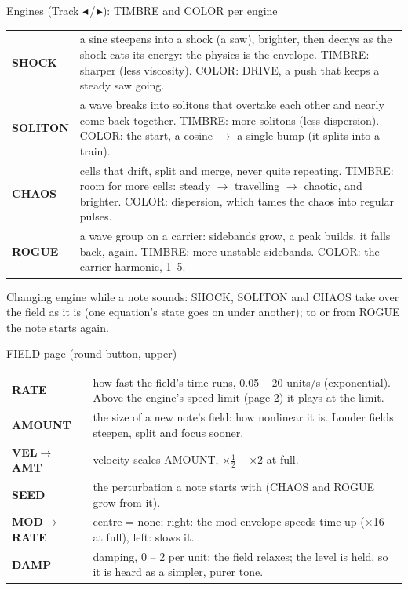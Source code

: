 \documentclass{article}
\newcommand{\FD}[1]{\textcolor{fdc}{#1}}
\newcommand{\EN}[1]{\textcolor{engc}{#1}}
\begin{document}
\vspace{1.2mm}
\begin{minipage}[t]{84mm}\vspace{0pt}
\begin{card}{Engines (Track \(\blacktriangleleft\)\,/\,\(\blacktriangleright\)): TIMBRE and COLOR per engine}
\fontsize{6.8}{8.1}\selectfont
\begin{tabularx}{\linewidth}{@{}l L@{}}
\EN{\textbf{SHOCK}} & a sine steepens into a shock (a saw), brighter, then decays as the shock eats its energy: the physics is the envelope.
\EN{TIMBRE}: sharper (less viscosity). \EN{COLOR}: DRIVE, a push that keeps a steady saw going. \\
\EN{\textbf{SOLITON}} & a wave breaks into solitons that overtake each other and nearly come back together. \EN{TIMBRE}: more solitons
(less dispersion). \EN{COLOR}: the start, a cosine \(\to\) a single bump (it splits into a train). \\
\EN{\textbf{CHAOS}} & cells that drift, split and merge, never quite repeating. \EN{TIMBRE}: room for more cells: steady \(\to\)
travelling \(\to\) chaotic, and brighter. \EN{COLOR}: dispersion, which tames the chaos into regular pulses. \\
\EN{\textbf{ROGUE}} & a wave group on a carrier: sidebands grow, a peak builds, it falls back, again. \EN{TIMBRE}: more unstable
sidebands. \EN{COLOR}: the carrier harmonic, 1--5. \\
\end{tabularx}
\vspace{0.3mm}
Changing engine while a note sounds: SHOCK, SOLITON and CHAOS take over the field as it is (one equation's state
goes on under another); to or from ROGUE the note starts again.
\end{card}
\begin{card}{FIELD page (round button, upper)}
\fontsize{6.8}{8.1}\selectfont
\begin{tabularx}{\linewidth}{@{}l L@{}}
\FD{\textbf{RATE}} & how fast the field's time runs, 0.05 -- 20 units/s (exponential). Above the engine's speed limit (page 2)
it plays at the limit. \\
\FD{\textbf{AMOUNT}} & the size of a new note's field: how nonlinear it is. Louder fields steepen, split and focus sooner. \\
\FD{\textbf{VEL\(\to\)AMT}} & velocity scales AMOUNT, \(\times\frac12\) -- \(\times\)2 at full. \\
\FD{\textbf{SEED}} & the perturbation a note starts with (CHAOS and ROGUE grow from it). \\
\FD{\textbf{MOD\(\to\)RATE}} & centre = none; right: the mod envelope speeds time up (\(\times\)16 at full), left: slows it. \\
\FD{\textbf{DAMP}} & damping, 0 -- 2 per unit: the field relaxes; the level is held, so it is heard as a simpler, purer tone. \\
\end{tabularx}
\end{card}
\end{minipage}\hfill
\end{document}
